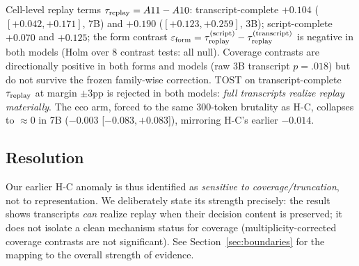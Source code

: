 Cell-level replay terms $\tau_{\mathrm{replay}}=A11-A10$: transcript-complete $+0.104$ ($[+0.042,+0.171]$, 7B) and $+0.190$ ($[+0.123,+0.259]$, 3B); script-complete $+0.070$ and $+0.125$; the form contrast $\varepsilon_{\mathrm{form}}=\tau_{\mathrm{replay}}^{\mathrm{(script)}}-\tau_{\mathrm{replay}}^{\mathrm{(transcript)}}$ is negative in both models (Holm over 8 contrast tests: all null). Coverage contrasts are directionally positive in both forms and models (raw 3B transcript $p=.018$) but do not survive the frozen family-wise correction. TOST on transcript-complete $\tau_{\mathrm{replay}}$ at margin $\pm 3$pp is rejected in both models: \emph{full transcripts realize replay materially}. The eco arm, forced to the same 300-token brutality as H-C, collapses to $\approx 0$ in 7B ($-0.003$ [$-0.083, +0.083$]), mirroring H-C's earlier $-0.014$.

\subsection{Resolution}
Our earlier H-C anomaly is thus identified as \emph{sensitive to coverage/truncation}, not to representation. We deliberately state its strength precisely: the result shows transcripts \emph{can} realize replay when their decision content is preserved; it does not isolate a clean mechanism status for coverage (multiplicity-corrected coverage contrasts are not significant). See Section~\ref{sec:boundaries} for the mapping to the overall strength of evidence.

